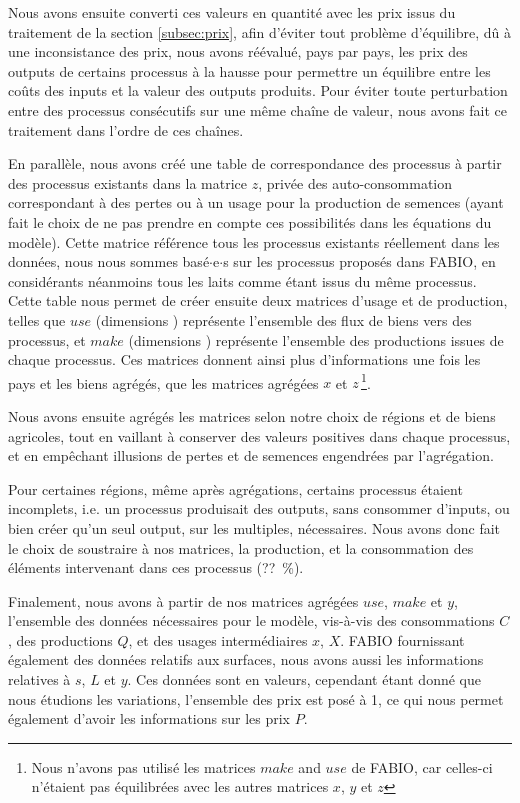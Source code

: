 Nous avons ensuite converti ces valeurs en quantité avec les prix issus du traitement de la section \ref{subsec:prix}, afin d'éviter tout problème d'équilibre, dû à une inconsistance des prix, nous avons réévalué, pays par pays, les prix des outputs de certains processus à la hausse pour permettre un équilibre entre les coûts des inputs et la valeur des outputs produits. Pour éviter toute perturbation entre des processus consécutifs sur une même chaîne de valeur, nous avons fait ce traitement dans l'ordre de ces chaînes.

En parallèle, nous avons créé une table de correspondance des processus à partir des processus existants dans la matrice $z$, privée des auto-consommation correspondant à des pertes ou à un usage pour la production de semences (ayant fait le choix de ne pas prendre en compte ces possibilités dans les équations du modèle). Cette matrice référence tous les processus existants réellement dans les données, nous nous sommes basé$\cdot$e$\cdot$s sur les processus proposés dans FABIO, en considérants néanmoins tous les laits comme étant issus du même processus. Cette table nous permet de créer ensuite deux matrices d'usage et de production, telles que $use$ (dimensions ) représente l'ensemble des flux de biens vers des processus, et $make$ (dimensions ) représente l'ensemble des productions issues de chaque processus. Ces matrices donnent ainsi plus d'informations une fois les pays et les biens agrégés, que les matrices agrégées $x$ et $z$\,\footnote{Nous n'avons pas utilisé les matrices $make$ and $use$ de FABIO, car celles-ci n'étaient pas équilibrées avec les autres matrices $x$, $y$ et $z$}.

Nous avons ensuite agrégés les matrices selon notre choix de régions et de biens agricoles, tout en vaillant à conserver des valeurs positives dans chaque processus, et en empêchant illusions de pertes et de semences engendrées par l'agrégation.

Pour certaines régions, même après agrégations, certains processus étaient incomplets, i.e. un processus produisait des outputs, sans consommer d'inputs, ou bien créer qu'un seul output, sur les multiples, nécessaires. Nous avons donc fait le choix de soustraire à nos matrices, la production, et la consommation des éléments intervenant dans ces processus (??~\%).

Finalement, nous avons à partir de nos matrices agrégées $use$, $make$ et $y$, l'ensemble des données nécessaires pour le modèle, vis-à-vis des consommations $C$, des productions $Q$, et des usages intermédiaires $x$, $X$. FABIO fournissant également des données relatifs aux surfaces, nous avons aussi les informations relatives à $s$, $L$ et $y$. Ces données sont en valeurs, cependant étant donné que nous étudions les variations, l'ensemble des prix est posé à 1, ce qui nous permet également d'avoir les informations sur les prix $P$.


